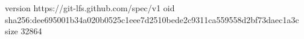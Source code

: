 version https://git-lfs.github.com/spec/v1
oid sha256:dee695001b34a020b0525c1eee7d2510bede2c9311ca559558d2bf73daec1a3c
size 32864
